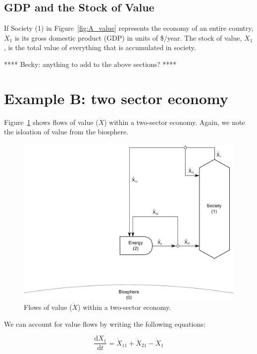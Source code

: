 \subsection{GDP and the Stock of Value}

If Society (1) in Figure~\ref{fig:A_value} represents 
the economy of an entire country, 
$\dot{X}_{1}$ is its gross domestic product (GDP)
in units of \$/year.
The stock of value, $X_1$, is the total value of everything that 
is accumulated in society.

**** Becky: anything to add to the above sections? ****


\section{Example B: two sector economy}

Figure~\ref{fig:B_value} shows flows of value ($\dot{X}$) 
within a two-sector economy. 
Again, we note the isloation of value from the biosphere.

\begin{figure}[h!]
\centering
\includegraphics[width=0.8\linewidth]{Part_3/Chapter_Values/images/2_sector_value.pdf}
\caption{Flows of value ($\dot{X}$) within a two-sector economy.}
\label{fig:B_value}
\end{figure}

We can account for value flows by writing
the following equations:

\begin{equation}
	\frac{\mathrm{d}X_{1}}{\mathrm{d}t}
	= \dot{X}_{11}
	+ \dot{X}_{21}
	- \dot{X}_{1}
\end{equation}

